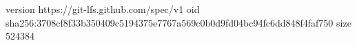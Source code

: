 version https://git-lfs.github.com/spec/v1
oid sha256:3708cf8f33b350409c5194375e7767a569c0b0d9fd04bc94fc6dd848f4faf750
size 524384
